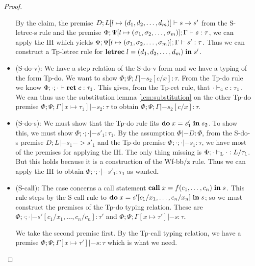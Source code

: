 \documentclass[a4paper, oneside, 10pt, draft]{memoir}
\begin{document}
\begin{proof}
\begin{itemize}
    By the claim, the premise $D;L[l\mapsto (d_1, d_2, \dotsc, d_m)] |- s -> s'$
    from the S-letrec-s rule and the premise $\Phi;\Psi[l \mapsto
    (\sigma_1, \sigma_2, \dotsc, \sigma_m)];\Gamma |- s : \tau$, we can apply the IH which yields $\Phi;\Psi[l \mapsto
    (\sigma_1, \sigma_2, \dotsc, \sigma_m)];\Gamma |- s' : \tau$. Thus we can construct a Tp-letrec
    rule for $\mathbf{letrec} \; l = (d_1, d_2, \dotsc, d_m) \; \mathbf{in} \; s'$.
  \item (S-do-v):
    We have a step relation of the S-do-v form and we have a typing of
    the form Tp-do. We want to show $\Phi;\Psi;\Gamma |- s_2[c/x] :
    \tau$. From the Tp-do rule we know $\Phi;\cdot;\cdot |- \mathbf{ret} \; c :
    \tau_1$. This gives, from the Tp-ret rule, that $\cdot |-_{\mathrm{c}} c :
    \tau_1$. We can thus use the substitution lemma
    \ref{lem:substitution} on the other Tp-do premise
    $\Phi;\Psi;\Gamma[x \mapsto \tau_1] |- s_2 : \tau$ to obtain
    $\Phi;\Psi;\Gamma |- s_2[c/x] : \tau$.
  \item (S-do-s): We must show that the Tp-do rule fits
    $\mathbf{do} \; x = s'_1 \; \mathbf{in} \; s_2$. To show this, we must show $\Phi;\cdot;\cdot
    |- s'_1 : \tau_1$. By the assumption $\Phi |- D : \Phi$, from the
    S-do-s premise $D;L |- s_1 -> s'_1$ and the Tp-do premise
    $\Phi;\cdot;\cdot |- s_1 : \tau$, we have most of the premises for
    applying the IH. The only thing missing is $\Phi;\cdot |-_{\mathrm{L}} \cdot
    : L / \tau_1$. But this holds because it is a construction of the
    Wf-bb/z rule. Thus we can apply the IH to obtain $\Phi;\cdot;\cdot
    |- s'_1 : \tau_1$ as wanted.
  \item (S-call):
    The case concerns a call statement
    $\mathbf{call} \; x = f (c_1,\dotsc,c_n)\; \mathbf{in} \; s$. This rule steps by the S-call
    rule to $\mathbf{do} \; x = s'[c_1/x_1,\dotsc,c_n/x_n] \; \mathbf{in} \; s$; so we
    must construct the premises of the Tp-do typing relation. These are
    $\Phi;\cdot;\cdot |- s'[c_1/x_1,\dotsc,c_n/c_n] : \tau'$ and
    $\Phi;\Psi;\Gamma[x \mapsto  \tau'] |- s : \tau$.

    We take the second premise first. By the Tp-call typing relation, we
    have a premise $\Phi;\Psi;\Gamma[x \mapsto \tau'] |- s : \tau$
    which is what we need.


\end{itemize}
\end{proof}
\end{document}
